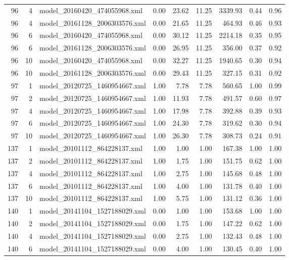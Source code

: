 \begin{table}[ht]
\begin{tabular}{rrlrrrrrr}
   96 &   4 & model\_20160420\_474055968.xml & 0.00 & 23.62 & 11.25 & 3339.93 & 0.44 & 0.96 \\ 
   96 &   4 & model\_20161128\_2006303576.xml & 0.00 & 21.65 & 11.25 & 464.93 & 0.46 & 0.93 \\ 
   96 &   6 & model\_20160420\_474055968.xml & 0.00 & 30.12 & 11.25 & 2214.18 & 0.35 & 0.95 \\ 
   96 &   6 & model\_20161128\_2006303576.xml & 0.00 & 26.95 & 11.25 & 356.00 & 0.37 & 0.92 \\ 
   96 &  10 & model\_20160420\_474055968.xml & 0.00 & 32.27 & 11.25 & 1940.65 & 0.30 & 0.94 \\ 
   96 &  10 & model\_20161128\_2006303576.xml & 0.00 & 29.43 & 11.25 & 327.15 & 0.31 & 0.92 \\ 
   97 &   1 & model\_20120725\_1460954667.xml & 1.00 & 7.78 & 7.78 & 560.65 & 1.00 & 0.99 \\ 
   97 &   2 & model\_20120725\_1460954667.xml & 1.00 & 11.93 & 7.78 & 491.57 & 0.60 & 0.97 \\ 
   97 &   4 & model\_20120725\_1460954667.xml & 1.00 & 17.98 & 7.78 & 392.88 & 0.39 & 0.93 \\ 
   97 &   6 & model\_20120725\_1460954667.xml & 1.00 & 24.30 & 7.78 & 319.62 & 0.30 & 0.94 \\ 
   97 &  10 & model\_20120725\_1460954667.xml & 1.00 & 26.30 & 7.78 & 308.73 & 0.24 & 0.91 \\ 
  137 &   1 & model\_20101112\_864228137.xml & 1.00 & 1.00 & 1.00 & 167.38 & 1.00 & 1.00 \\ 
  137 &   2 & model\_20101112\_864228137.xml & 1.00 & 1.75 & 1.00 & 151.75 & 0.62 & 1.00 \\ 
  137 &   4 & model\_20101112\_864228137.xml & 1.00 & 2.75 & 1.00 & 145.68 & 0.48 & 1.00 \\ 
  137 &   6 & model\_20101112\_864228137.xml & 1.00 & 4.00 & 1.00 & 131.78 & 0.40 & 1.00 \\ 
  137 &  10 & model\_20101112\_864228137.xml & 1.00 & 5.75 & 1.00 & 131.12 & 0.36 & 1.00 \\ 
  140 &   1 & model\_20141104\_1527188029.xml & 0.00 & 1.00 & 1.00 & 153.68 & 1.00 & 1.00 \\ 
  140 &   2 & model\_20141104\_1527188029.xml & 0.00 & 1.75 & 1.00 & 147.22 & 0.62 & 1.00 \\ 
  140 &   4 & model\_20141104\_1527188029.xml & 0.00 & 2.75 & 1.00 & 132.43 & 0.48 & 1.00 \\ 
  140 &   6 & model\_20141104\_1527188029.xml & 0.00 & 4.00 & 1.00 & 130.45 & 0.40 & 1.00 \\ 

\end{tabular}
\end{table}
